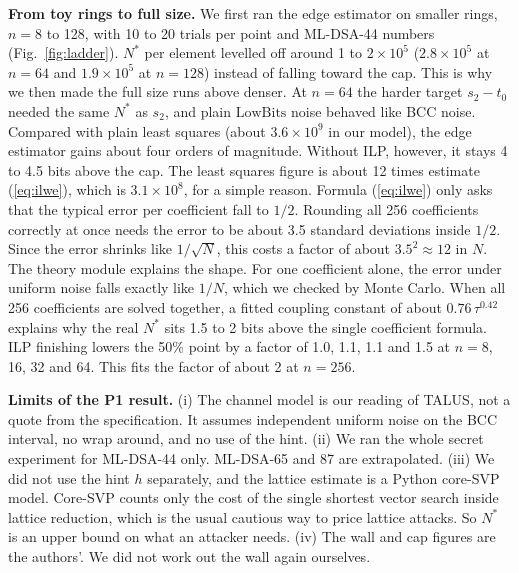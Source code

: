 \documentclass[10pt,conference,a4paper]{IEEEtran}
\newcommand{\LB}{\mathrm{LowBits}}
\begin{document}
\textbf{From toy rings to full size.} We first ran the edge estimator on smaller rings, $n=8$ to 128, with 10 to 20 trials
per point and ML-DSA-44 numbers (Fig.~\ref{fig:ladder}). $N^*$ per element levelled off around 1 to $2\times10^5$
($2.8\times10^5$ at $n=64$ and $1.9\times10^5$ at $n=128$) instead of falling toward the cap. This is why we then made the
full size runs above denser. At $n=64$ the harder target $s_2-t_0$ needed the same $N^*$ as $s_2$, and plain $\LB$ noise
behaved like BCC noise. Compared with plain least squares (about $3.6\times10^9$ in our model), the edge estimator gains
about four orders of magnitude. Without ILP, however, it stays 4 to 4.5 bits above the cap. The least squares figure is
about 12 times estimate (\ref{eq:ilwe}), which is $3.1\times10^8$, for a simple reason. Formula (\ref{eq:ilwe}) only asks
that the typical error per coefficient fall to $1/2$. Rounding all 256 coefficients correctly at once needs the error to be
about 3.5 standard deviations inside $1/2$. Since the error shrinks like $1/\sqrt N$, this costs a factor of about
$3.5^2\approx12$ in $N$. The theory module explains the shape. For one coefficient alone, the error under uniform noise
falls exactly like $1/N$, which we checked by Monte Carlo. When all 256 coefficients are solved together, a fitted coupling
constant of about $0.76\,\tau^{0.42}$ explains why the real $N^*$ sits 1.5 to 2 bits above the single coefficient formula.
ILP finishing lowers the 50\% point by a factor of 1.0, 1.1, 1.1 and 1.5 at $n=8$, 16, 32 and 64. This fits the factor of
about 2 at $n=256$.

\textbf{Limits of the P1 result.} (i) The channel model is our reading of TALUS, not a quote from the specification. It
assumes independent uniform noise on the BCC interval, no wrap around, and no use of the hint. (ii) We ran the whole secret
experiment for ML-DSA-44 only. ML-DSA-65 and 87 are extrapolated. (iii) We did not use the hint $h$ separately, and the
lattice estimate is a Python core-SVP model. Core-SVP counts only the cost of the single shortest vector search inside
lattice reduction, which is the usual cautious way to price lattice attacks. So $N^*$ is an upper bound on what an attacker
needs. (iv) The wall and cap figures are the authors'. We did not work out the wall again ourselves.
\end{document}
